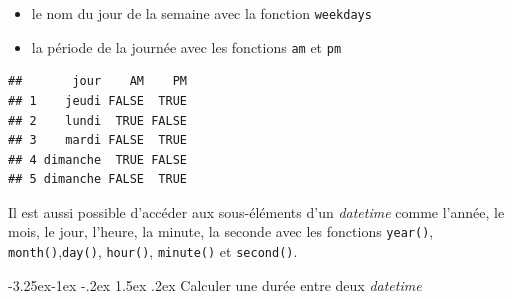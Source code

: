\documentclass[
  11pt,
  french,
]{book}
\makeatletter
\newenvironment{Shaded}{\begin{snugshade}}{\end{snugshade}}
\newcommand{\DataTypeTok}[1]{\textcolor[rgb]{0.13,0.29,0.53}{#1}}
\newcommand{\DecValTok}[1]{\textcolor[rgb]{0.00,0.00,0.81}{#1}}
\newcommand{\KeywordTok}[1]{\textcolor[rgb]{0.13,0.29,0.53}{\textbf{#1}}}
\newcommand{\NormalTok}[1]{#1}
\newcommand{\OperatorTok}[1]{\textcolor[rgb]{0.81,0.36,0.00}{\textbf{#1}}}
\newcommand{\StringTok}[1]{\textcolor[rgb]{0.31,0.60,0.02}{#1}}
\providecommand{\tightlist}{%
  \setlength{\itemsep}{0pt}\setlength{\parskip}{0pt}}
\newenvironment{kframe}{%
\medskip{}
\setlength{\fboxsep}{.8em}
 \def\at@end@of@kframe{}%
 \ifinner\ifhmode%
  \def\at@end@of@kframe{\end{minipage}}%
  \begin{minipage}{\columnwidth}%
 \fi\fi%
 \def\FrameCommand##1{\hskip\@totalleftmargin \hskip-\fboxsep
 \colorbox{shadecolor}{##1}\hskip-\fboxsep
     \hskip-\linewidth \hskip-\@totalleftmargin \hskip\columnwidth}%
 \MakeFramed {\advance\hsize-\width
   \@totalleftmargin\z@ \linewidth\hsize
   \@setminipage}}%
 {\par\unskip\endMakeFramed%
 \at@end@of@kframe}
\renewenvironment{Shaded}{\begin{kframe}}{\end{kframe}}
\renewcommand\paragraph{\@startsection{paragraph}{4}{\z@}%
   {-3.25ex\@plus -1ex \@minus -.2ex}%
   {1.5ex \@plus .2ex}%
   {\normalfont\normalsize\bfseries}}
\makeatother
\begin{document}
\begin{itemize}
\tightlist
\item
  le nom du jour de la semaine avec la fonction \texttt{weekdays}
\end{itemize}

\begin{Shaded}
\end{Shaded}

\begin{itemize}
\tightlist
\item
  la période de la journée avec les fonctions \texttt{am} et \texttt{pm}
\end{itemize}

\begin{Shaded}
\end{Shaded}

\begin{verbatim}
##       jour    AM    PM
## 1    jeudi FALSE  TRUE
## 2    lundi  TRUE FALSE
## 3    mardi FALSE  TRUE
## 4 dimanche  TRUE FALSE
## 5 dimanche FALSE  TRUE
\end{verbatim}

Il est aussi possible d'accéder aux sous-éléments d'un \emph{datetime} comme l'année, le mois, le jour, l'heure, la minute, la seconde avec les fonctions \texttt{year()}, \texttt{month()},\texttt{day()}, \texttt{hour()}, \texttt{minute()} et \texttt{second()}.

\hypertarget{sect014263}{%
\paragraph{\texorpdfstring{Calculer une durée entre deux \emph{datetime}}{Calculer une durée entre deux datetime}}\label{sect014263}}
\end{document}
